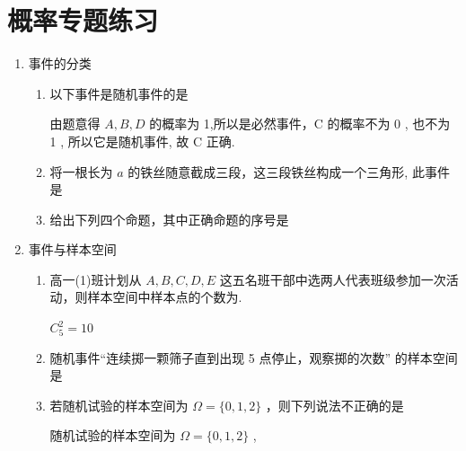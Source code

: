 \chapter*{概率专题练习}

\begin{enumerate}
    \item 事件的分类
    \begin{enumerate}
        \item 以下事件是随机事件的是
        \begin{jieda}
            由题意得 ${A},{B},{D}$ 的概率为 1,所以是必然事件，C 的概率不为 0 , 也不为 1 , 所以它是随机事件, 故 C 正确.
        \end{jieda}
        
        \item 将一根长为 $a$ 的铁丝随意截成三段，这三段铁丝构成一个三角形, 此事件是
        
        \item 给出下列四个命题，其中正确命题的序号是
    \end{enumerate}
    
    \item 事件与样本空间
    \begin{enumerate}
        \item 高一(1)班计划从 $A,B,C,D,E$ 这五名班干部中选两人代表班级参加一次活动，则样本空间中样本点的个数为.
        \begin{jieda}
            $C_5^2 = 10$
        \end{jieda}
        \item 随机事件“连续掷一颗筛子直到出现 5 点停止，观察掷的次数” 的样本空间是
        \item 若随机试验的样本空间为 $\Omega  = \{ 0,1,2\}$ ，则下列说法不正确的是
        \begin{jieda}
            随机试验的样本空间为 $\Omega  = \{ 0,1,2\}$ ,
            

\end{jieda}
\end{enumerate}
\end{enumerate}
